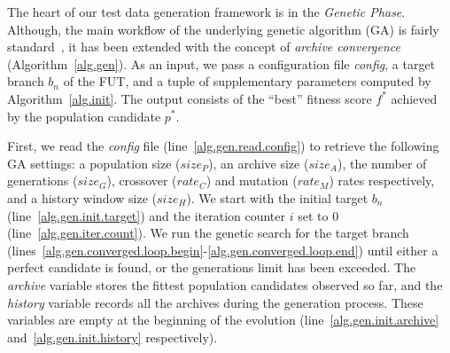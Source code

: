 The heart of our test data generation framework is in the \emph{Genetic Phase}. Although, the main workflow of the underlying genetic algorithm (GA) is fairly standard~\cite{poli2008field}, it has been extended with the concept of \emph{archive convergence} (Algorithm~\ref{alg.gen}). As an input, we pass a configuration file \emph{config}, a target branch $b_n$ of the FUT, and a tuple of supplementary parameters computed by Algorithm~\ref{alg.init}. The output consists of the ``best'' fitness score $f^*$ achieved by the population candidate $p^*$.

First, we read the \emph{config} file (line~\ref{alg.gen.read.config}) to retrieve the following GA settings: a population size  ($size_P$), an archive size ($size_A$), the number of generations ($size_G$), crossover ($rate_C$) and mutation ($rate_M$) rates respectively, and a history window size ($size_H$). We start with the initial target $b_n$ (line~\ref{alg.gen.init.target}) and the iteration counter $i$ set to 0 (line~\ref{alg.gen.iter.count}). We run the genetic search for the target branch (lines~\ref{alg.gen.converged.loop.begin}-\ref{alg.gen.converged.loop.end}) until either a perfect candidate is found, or the generations limit has been exceeded. The \emph{archive} variable stores the fittest population candidates observed so far, and the \emph{history} variable records all the archives during the generation process. These variables are empty at the beginning of the evolution (line~\ref{alg.gen.init.archive} and~\ref{alg.gen.init.history} respectively).

